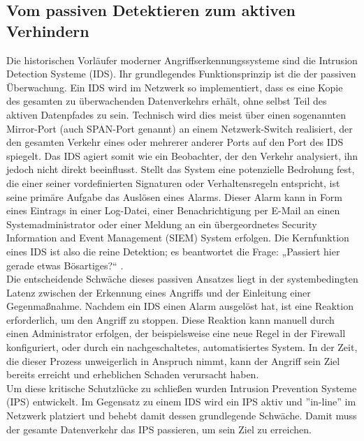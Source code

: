 \subsection{Vom passiven Detektieren zum aktiven Verhindern}

Die historischen Vorläufer moderner Angriffserkennungssysteme sind die Intrusion Detection Systeme (IDS). Ihr grundlegendes Funktionsprinzip ist die der passiven Überwachung. Ein IDS wird im Netzwerk so implementiert, dass es eine Kopie des gesamten zu überwachenden Datenverkehrs erhält, ohne selbst Teil des aktiven Datenpfades zu sein. Technisch wird dies meist über einen sogenannten Mirror-Port (auch SPAN-Port genannt) an einem Netzwerk-Switch realisiert, der den gesamten Verkehr eines oder mehrerer anderer Ports auf den Port des IDS spiegelt. Das IDS agiert somit wie ein Beobachter, der den Verkehr analysiert, ihn jedoch nicht direkt beeinflusst. Stellt das System eine potenzielle Bedrohung fest, die einer seiner vordefinierten Signaturen oder Verhaltensregeln entspricht, ist seine primäre Aufgabe das Auslösen eines Alarms. Dieser Alarm kann in Form eines Eintrags in einer Log-Datei, einer Benachrichtigung per E-Mail an einen Systemadministrator oder einer Meldung an ein übergeordnetes Security Information and Event Management (SIEM) System erfolgen. Die Kernfunktion eines IDS ist also die reine Detektion; es beantwortet die Frage: „Passiert hier gerade etwas Bösartiges?“ \cite{Claudia1}.\\

Die entscheidende Schwäche dieses passiven Ansatzes liegt in der systembedingten Latenz zwischen der Erkennung eines Angriffs und der Einleitung einer Gegenmaßnahme. Nachdem ein IDS einen Alarm ausgelöst hat, ist eine Reaktion erforderlich, um den Angriff zu stoppen. Diese Reaktion kann manuell durch einen Administrator erfolgen, der beispielsweise eine neue Regel in der Firewall konfiguriert, oder durch ein nachgeschaltetes, automatisiertes System. In der Zeit, die dieser Prozess unweigerlich in Anspruch nimmt, kann der Angriff sein Ziel bereits erreicht und erheblichen Schaden verursacht haben.\\

Um diese kritische Schutzlücke zu schließen wurden Intrusion Prevention Systeme (IPS) entwickelt. Im Gegensatz zu einem IDS wird ein IPS aktiv und ''in-line'' im Netzwerk platziert und behebt damit dessen grundlegende Schwäche. Damit muss der gesamte Datenverkehr das IPS passieren, um sein Ziel zu erreichen. \\


